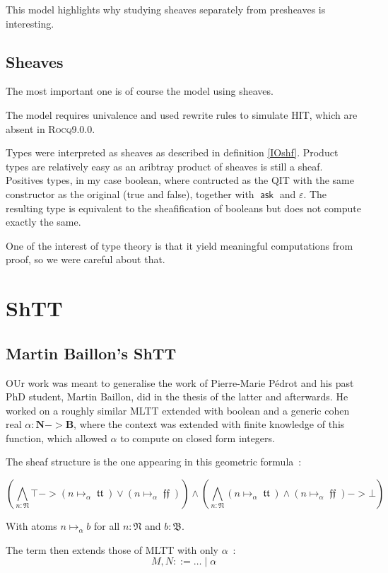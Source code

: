 \documentclass[11pt]{article}
\DeclareMathOperator{\ask}{\mathsf{ask}}
\DeclareMathOperator{\mtrue}{\mathfrak{tt}}
\DeclareMathOperator{\mfalse}{\mathfrak{ff}}
\newcommand{\0}{\mathbf{0}}
\newcommand{\1}{\mathbf{1}}
\newcommand{\nat}{\mathbf{N}}
\newcommand{\mnat}{\mathfrak{N}}
\newcommand{\bool}{\mathbf{B}}
\newcommand{\mbool}{\mathfrak{B}}
\newcommand{\rocq}{\textsc{Rocq}}
\begin{document}
This model highlights why studying sheaves separately from presheaves is interesting.

\subsection{Sheaves}

The most important one is of course the model using sheaves.

The model requires univalence and used rewrite rules to simulate HIT, which are absent in \rocq 9.0.0.

Types were interpreted as sheaves as described in definition \ref{IOshf}. Product types are relatively easy as an aribtray product of sheaves is still a sheaf. Positives types, in my case boolean, where contructed as the QIT with the same constructor as the original (true and false), together with $\ask$ and $\varepsilon$. The resulting type is equivalent to the sheafification of booleans but does not compute exactly the same.

One of the interest of type theory is that it yield meaningful computations from proof, so we were careful about that.

\section{ShTT}\label{ShTT}
\subsection{Martin Baillon's ShTT}\label{MBshtt}
OUr work was meant to generalise the work of Pierre-Marie Pédrot and his past PhD student, Martin Baillon, did in the thesis of the latter \cite{baillon:tel-04617881} and afterwards. He worked on a roughly similar MLTT extended with boolean and a generic cohen real $\alpha: \nat -> \bool$, where the context was extended with finite knowledge of this function, which allowed $\alpha$ to compute on closed form integers.

The sheaf structure is the one appearing in this geometric formula~:

$$ \left(\bigwedge_{n : \mnat} \top -> (n \mapsto_\alpha \mtrue) \vee (n \mapsto_\alpha \mfalse)\right) \wedge \left(\bigwedge_{n : \mnat} (n\mapsto_\alpha \mtrue) \wedge (n \mapsto_\alpha \mfalse) -> \bot \right)$$

With atoms $n \mapsto_\alpha b$ for all $n : \mnat$ and $b:\mbool$.


The term then extends those of MLTT with only $\alpha$~:
$$ M, N ::= \dots \mid \alpha$$
\end{document}
